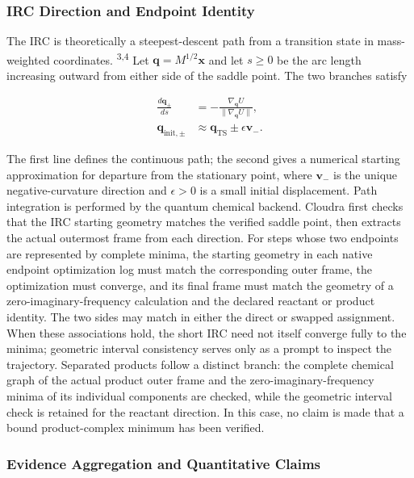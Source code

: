 \subsubsection{IRC Direction and Endpoint Identity}

The IRC is theoretically a steepest-descent path from a transition state in mass-weighted coordinates. \textsuperscript{3,4} Let $\mathbf q=M^{1/2}\mathbf x$ and let $s\ge0$ be the arc length increasing outward from either side of the saddle point. The two branches satisfy

\begin{equation}\label{eq:methods-12}
\begin{aligned}
\frac{d\mathbf q_{\pm}}{ds}&=-\frac{\nabla_{\mathbf q}U}{\|\nabla_{\mathbf q}U\|},\\
\mathbf q_{\mathrm{init},\pm}&\approx\mathbf q_{\mathrm{TS}}\pm\epsilon\mathbf v_{-}.
\end{aligned}
\end{equation}

The first line defines the continuous path; the second gives a numerical starting approximation for departure from the stationary point, where $\mathbf v_-$ is the unique negative-curvature direction and $\epsilon>0$ is a small initial displacement. Path integration is performed by the quantum chemical backend. Cloudra first checks that the IRC starting geometry matches the verified saddle point, then extracts the actual outermost frame from each direction. For steps whose two endpoints are represented by complete minima, the starting geometry in each native endpoint optimization log must match the corresponding outer frame, the optimization must converge, and its final frame must match the geometry of a zero-imaginary-frequency calculation and the declared reactant or product identity. The two sides may match in either the direct or swapped assignment. When these associations hold, the short IRC need not itself converge fully to the minima; geometric interval consistency serves only as a prompt to inspect the trajectory. Separated products follow a distinct branch: the complete chemical graph of the actual product outer frame and the zero-imaginary-frequency minima of its individual components are checked, while the geometric interval check is retained for the reactant direction. In this case, no claim is made that a bound product-complex minimum has been verified.

\subsubsection{Evidence Aggregation and Quantitative Claims}

